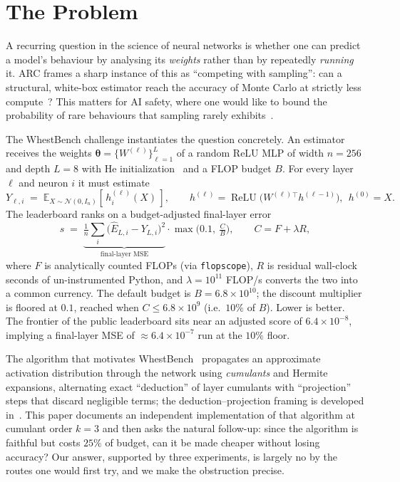 \documentclass[11pt]{article}
\newcommand{\E}{\mathbb{E}}
\newcommand{\relu}{\operatorname{ReLU}}
\newcommand{\N}{\mathcal{N}}
\newcommand{\Wl}{W^{(\ell)}}
\newcommand{\hl}{h^{(\ell)}}
\newcommand{\Ehat}{\widehat{E}}
\theoremstyle{remark}
\begin{document}
\section{The Problem}
\label{sec:problem}

A recurring question in the science of neural networks is whether one can
predict a model's behaviour by analysing its \emph{weights} rather than by
repeatedly \emph{running} it. ARC frames a sharp instance of this as
``competing with sampling'': can a structural, white-box estimator reach the
accuracy of Monte Carlo at strictly less compute~\cite{wu2026wide,
arc2026whestbench}? This matters for AI safety, where one would like to bound
the probability of rare behaviours that sampling rarely
exhibits~\cite{christiano2024iterated, xu2021lpe, hendrycks2021unsolved}.

The WhestBench challenge instantiates the question concretely. An estimator
receives the weights $\bm{\theta}=\{\Wl\}_{\ell=1}^{L}$ of a random ReLU MLP of
width $n=256$ and depth $L=8$ with He initialization~\cite{he2015delving} and a
FLOP budget $B$. For every layer $\ell$ and neuron $i$ it must estimate
\begin{equation}
  Y_{\ell,i} \;=\; \E_{X\sim\N(0,I_n)}\!\left[\,\hl_i(X)\,\right],
  \qquad
  \hl = \relu\!\big(\Wl{}^{\!\top}h^{(\ell-1)}\big),\ \ h^{(0)}=X.
  \label{eq:target}
\end{equation}
The leaderboard ranks on a budget-adjusted final-layer error
\begin{equation}
  s \;=\; \underbrace{\tfrac{1}{n}\textstyle\sum_i\big(\Ehat_{L,i}-Y_{L,i}\big)^2}_{\text{final-layer MSE}}
      \cdot \max\!\Big(0.1,\ \tfrac{C}{B}\Big),
  \qquad C = F + \lambda R,
  \label{eq:score}
\end{equation}
where $F$ is analytically counted FLOPs (via \texttt{flopscope}), $R$ is
residual wall-clock seconds of un-instrumented Python, and $\lambda=10^{11}$
FLOP/s converts the two into a common currency. The default budget is
$B=6.8\times10^{10}$; the discount multiplier is floored at $0.1$, reached when
$C\le 6.8\times10^{9}$ (i.e.\ $10\%$ of $B$). Lower is better. The frontier of
the public leaderboard sits near an adjusted score of $6.4\times10^{-8}$,
implying a final-layer MSE of $\approx 6.4\times10^{-7}$ run at the $10\%$ floor.

The algorithm that motivates WhestBench~\cite{wu2026wide} propagates an
approximate activation distribution through the network using \emph{cumulants}
and Hermite expansions, alternating exact ``deduction'' of layer cumulants with
``projection'' steps that discard negligible terms; the deduction--projection
framing is developed in~\cite{wu2025deduction}. This paper documents an
independent implementation of that algorithm at cumulant order $k=3$ and then
asks the natural follow-up: since the algorithm is faithful but costs $25\%$ of
budget, can it be made cheaper without losing accuracy? Our answer, supported by
three experiments, is largely no by the routes one would first try, and we make
the obstruction precise.
\end{document}
